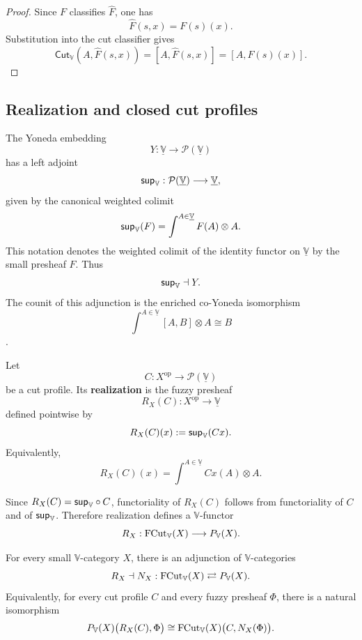 \begin{proof}
    Since \(F\) classifies \(\widehat F\), one has
    \[
        \widehat F(s,x)=F(s)(x).
    \]
    Substitution into the cut classifier gives
    \[
        \mathsf{Cut}_{\mathbb V}(A,\widehat F(s,x))
        =
        [A,\widehat F(s,x)]
        =
        [A,F(s)(x)].
    \]
\end{proof}

\subsection{Realization and closed cut profiles}
\label{subsec:realization-and-closed-enriched-cut-profiles}

The Yoneda embedding
\[
    Y:\underline{\mathbb V}\to\mathcal P(\underline{\mathbb V})
\]
has a left adjoint
\[
    \mathsf{sup}_{\mathbb V}:
    \mathcal P(\underline{\mathbb V})
    \longrightarrow
    \underline{\mathbb V},
\]
given by the canonical weighted colimit
\[
    \mathsf{sup}_{\mathbb V}(F)
    =
    \int^{A\in\underline{\mathbb V}}
    F(A)\otimes A.
\]
This notation denotes the weighted colimit of the identity functor on \(\underline{\mathbb V}\) by the small presheaf \(F\). Thus
\[
    \mathsf{sup}_{\mathbb V}\dashv Y.
\]
The counit of this adjunction is the enriched co-Yoneda isomorphism
\[
    \int^{A\in\underline{\mathbb V}}[A,B]\otimes A
    \cong
    B
\]
\cite[Section~1.9]{Kelly1982BasicConcepts}.

\begin{definition}
\label{def:realization-cut-profile}
    Let
    \[
        C:X^{\mathrm{op}}\to\mathcal P(\underline{\mathbb V})
    \]
    be a cut profile. Its \textbf{realization} is the fuzzy presheaf
    \[
        R_X(C):X^{\mathrm{op}}\to\underline{\mathbb V}
    \]
    defined pointwise by
    \[
        R_X(C)(x)
        :=
        \mathsf{sup}_{\mathbb V}(C x).
    \]
    Equivalently,
    \[
        R_X(C)(x)
        =
        \int^{A\in\underline{\mathbb V}}
        Cx(A)\otimes A.
    \]
\end{definition}

Since \(R_X(C)=\mathsf{sup}_{\mathbb V}\circ C\), functoriality of \(R_X(C)\) follows from functoriality of \(C\) and of \(\mathsf{sup}_{\mathbb V}\). Therefore realization defines a \(\mathbb V\)-functor
\[
    R_X:
    \operatorname{FCut}_{\mathbb V}(X)
    \longrightarrow
    P_{\mathbb V}(X).
\]

\begin{proposition}
\label{prop:realization-nerve-adjunction-intrinsic}
    For every small \(\mathbb V\)-category \(X\), there is an adjunction of \(\mathbb V\)-categories
    \[
        R_X
        \dashv
        N_X:
        \operatorname{FCut}_{\mathbb V}(X)
        \rightleftarrows
        P_{\mathbb V}(X).
    \]
    Equivalently, for every cut profile \(C\) and every fuzzy presheaf \(\Phi\), there is a natural isomorphism
    \[
        P_{\mathbb V}(X)\bigl(R_X(C),\Phi\bigr)
        \cong
        \operatorname{FCut}_{\mathbb V}(X)\bigl(C,N_X(\Phi)\bigr).
    \]
\end{proposition}

